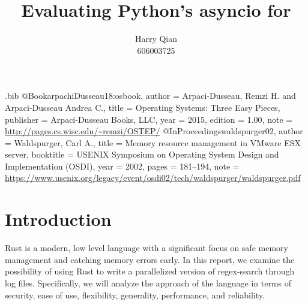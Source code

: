 \usepackage{filecontents}

\begin{filecontents}{\jobname.bib}
@Book{arpachiDusseau18:osbook,
  author =       {Arpaci-Dusseau, Remzi H. and Arpaci-Dusseau Andrea C.},
  title =        {Operating Systems: Three Easy Pieces},
  publisher =    {Arpaci-Dusseau Books, LLC},
  year =         2015,
  edition =      {1.00},
  note =         {\url{http://pages.cs.wisc.edu/~remzi/OSTEP/}}
}
@InProceedings{waldspurger02,
  author =       {Waldspurger, Carl A.},
  title =        {Memory resource management in {VMware ESX} server},
  booktitle =    {USENIX Symposium on Operating System Design and
                  Implementation (OSDI)},
  year =         2002,
  pages =        {181--194},
  note =         {\url{https://www.usenix.org/legacy/event/osdi02/tech/waldspurger/waldspurger.pdf}}}
\end{filecontents}



\date{}

\title{\Large \bf Evaluating Python's asyncio for }

\author{
{\rm Harry Qian}\\
606003725
} %

\maketitle

\section{Introduction}
Rust is a modern, low level language with a significant focus
on safe memory management and catching memory errors
early. In this report, we examine the possibility of using Rust 
to write a parallelized version of regex-search through log files.
Specifically, we will analyze the approach of the language in terms
of security, ease of use, flexibility, generality, performance, and 
reliability. 

